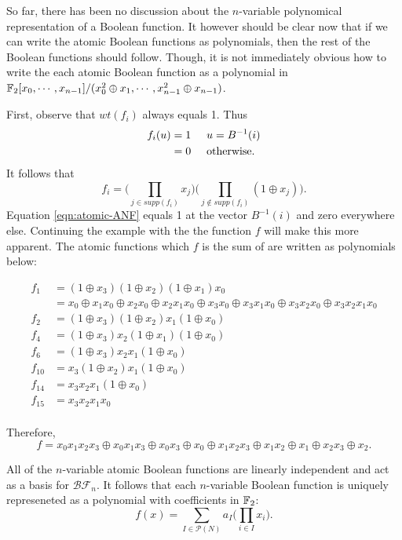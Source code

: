 \par So far, there has been no discussion about the $n$-variable polynomical
representation of a Boolean function. It however should be clear now that
if we can write the atomic Boolean functions as polynomials, then the
rest of the Boolean functions should follow. Though, it is not immediately
obvious how to write the each atomic Boolean function as a polynomial in
$\mathbb{F}_2[x_0,\cdots,x_{n-1}]/\allowbreak(x_0^2\oplus\allowbreak x_1,\cdots,x_{n-1}^2\oplus\allowbreak x_{n-1})$.

\par First, observe that $wt(f_i)$ always equals 1. Thus
\begin{align*}
	f_i(u)&=1\hspace{5mm}u=B^{-1}(i) \\
			  &=0\hspace{5mm}{\rm otherwise.}
\end{align*}
It follows that
\begin{equation}\label{eqn:atomic-ANF}
	f_i=\bigg(\prod_{j\in supp(f_i)}x_j\bigg)\bigg(\prod_{j\not\in supp(f_i)}(1\oplus x_j)\bigg).
\end{equation}
Equation \ref{eqn:atomic-ANF} equals 1 at the vector $B^{-1}(i)$ and zero
everywhere else. Continuing the example with the the function $f$ will make
this more apparent. The atomic functions which $f$ is the sum of are written
as polynomials below:

\begin{align*}
  f_1   &=(1\oplus x_3)(1\oplus x_2)(1\oplus x_1)x_0\\
        &=x_0 \oplus x_1x_0 \oplus x_2x_0 \oplus x_2x_1x_0 \oplus x_3x_0 \oplus x_3x_1x_0
        \oplus x_3x_2x_0 \oplus x_3x_2x_1x_0\\
  f_2   &=(1\oplus x_3)(1\oplus x_2)x_1(1\oplus x_0)\\
  f_4   &=(1\oplus x_3)x_2(1\oplus x_1)(1\oplus x_0)\\
  f_6   &=(1\oplus x_3)x_2x_1(1\oplus x_0)\\
  f_{10}&=x_3(1\oplus x_2)x_1(1\oplus x_0)\\
  f_{14}&=x_3x_2x_1(1\oplus x_0)\\
  f_{15}&=x_3x_2x_1x_0\\
\end{align*}

\par Therefore,
\[
	f=x_0x_1x_2x_3\oplus x_0x_1x_3 \oplus x_0x_3 \oplus x_0 \oplus x_1x_2x_3 \oplus
	x_1x_2\oplus x_1\oplus x_2x_3 \oplus x_2.
\]

\par All of the $n$-variable atomic Boolean functions are linearly independent and
act as a basis for $\mathcal{BF}_n$. It follows that each $n$-variable Boolean
function is uniquely represeneted as a polynomial with coefficients in $\mathbb{F}_2$:
\[
f(x)=\sum_{I\in\mathcal{P}(N)}a_I\bigg(\prod_{i\in I}x_i\bigg).
\]
